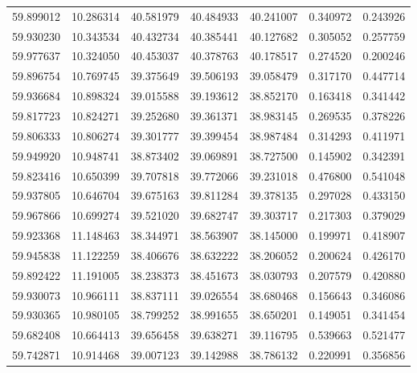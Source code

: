 \begin{tabular}{rrrrrrr}
 59.899012 &  10.286314 &         40.581979 &         40.484933 &         40.241007 &  0.340972 &  0.243926 \\
 59.930230 &  10.343534 &         40.432734 &         40.385441 &         40.127682 &  0.305052 &  0.257759 \\
 59.977637 &  10.324050 &         40.453037 &         40.378763 &         40.178517 &  0.274520 &  0.200246 \\
 59.896754 &  10.769745 &         39.375649 &         39.506193 &         39.058479 &  0.317170 &  0.447714 \\
 59.936684 &  10.898324 &         39.015588 &         39.193612 &         38.852170 &  0.163418 &  0.341442 \\
 59.817723 &  10.824271 &         39.252680 &         39.361371 &         38.983145 &  0.269535 &  0.378226 \\
 59.806333 &  10.806274 &         39.301777 &         39.399454 &         38.987484 &  0.314293 &  0.411971 \\
 59.949920 &  10.948741 &         38.873402 &         39.069891 &         38.727500 &  0.145902 &  0.342391 \\
 59.823416 &  10.650399 &         39.707818 &         39.772066 &         39.231018 &  0.476800 &  0.541048 \\
 59.937805 &  10.646704 &         39.675163 &         39.811284 &         39.378135 &  0.297028 &  0.433150 \\
 59.967866 &  10.699274 &         39.521020 &         39.682747 &         39.303717 &  0.217303 &  0.379029 \\
 59.923368 &  11.148463 &         38.344971 &         38.563907 &         38.145000 &  0.199971 &  0.418907 \\
 59.945838 &  11.122259 &         38.406676 &         38.632222 &         38.206052 &  0.200624 &  0.426170 \\
 59.892422 &  11.191005 &         38.238373 &         38.451673 &         38.030793 &  0.207579 &  0.420880 \\
 59.930073 &  10.966111 &         38.837111 &         39.026554 &         38.680468 &  0.156643 &  0.346086 \\
 59.930365 &  10.980105 &         38.799252 &         38.991655 &         38.650201 &  0.149051 &  0.341454 \\
 59.682408 &  10.664413 &         39.656458 &         39.638271 &         39.116795 &  0.539663 &  0.521477 \\
 59.742871 &  10.914468 &         39.007123 &         39.142988 &         38.786132 &  0.220991 &  0.356856 \\

\end{tabular}

